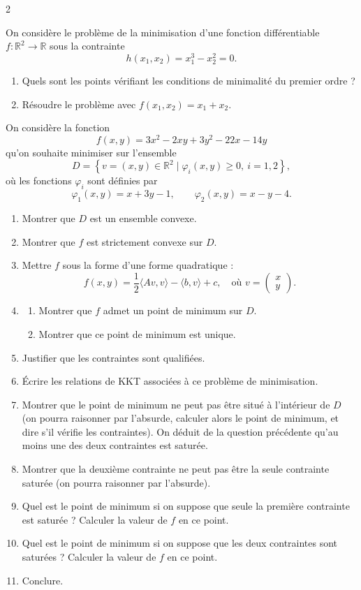 \begin{multicols}{2}
\begin{exo}
	On considère le problème de la minimisation d’une fonction différentiable \( f : \mathbb{R}^2 \rightarrow \mathbb{R} \) sous la contrainte
	\[
	h(x_1, x_2) = x_1^3 - x_2^2 = 0.
	\]
	\begin{enumerate}[label=\arabic*.,leftmargin=*]
		\item Quels sont les points vérifiant les conditions de minimalité du premier ordre ?
		\item Résoudre le problème avec \( f(x_1, x_2) = x_1 + x_2 \).
	\end{enumerate}
\end{exo}

\begin{exo}
	On considère la fonction
	\[
	f(x,y) = 3x^2 - 2xy + 3y^2 - 22x - 14y
	\]
	qu'on souhaite minimiser sur l'ensemble
	\[
	D = \left\{ v = (x,y) \in \mathbb{R}^2 \mid \varphi_i(x,y) \geq 0,\ i=1,2 \right\},
	\]
	où les fonctions $\varphi_i$ sont définies par
	\[
	\varphi_1(x,y) = x + 3y - 1, \qquad \varphi_2(x,y) = x - y - 4.
	\]
	\begin{enumerate}[label=\arabic*.]
		\item Montrer que $D$ est un ensemble convexe.
		\item Montrer que $f$ est strictement convexe sur $D$.
		\item Mettre $f$ sous la forme d'une forme quadratique :
		\[
		f(x,y) = \frac{1}{2} \langle A v, v \rangle - \langle b, v \rangle + c,
		\quad \text{où } v = \begin{pmatrix} x \\ y \end{pmatrix}.
		\]
		\item
		\begin{enumerate}
			\item Montrer que $f$ admet un point de minimum sur $D$.
			\item Montrer que ce point de minimum est unique.
		\end{enumerate}
		\item Justifier que les contraintes sont qualifiées.
		\item Écrire les relations de KKT associées à ce problème de minimisation.
		\item Montrer que le point de minimum ne peut pas être situé à l'intérieur de $D$ (on pourra raisonner par l'absurde, calculer alors le point de minimum, et dire s'il vérifie les contraintes).
		On déduit de la question précédente qu'au moins une des deux contraintes est saturée.
		\item Montrer que la deuxième contrainte ne peut pas être la seule contrainte saturée (on pourra raisonner par l'absurde).
		\item Quel est le point de minimum si on suppose que seule la première contrainte est saturée ? Calculer la valeur de $f$ en ce point.
		\item Quel est le point de minimum si on suppose que les deux contraintes sont saturées ? Calculer la valeur de $f$ en ce point.
		\item Conclure.
	\end{enumerate}
\end{exo}


\end{multicols}
